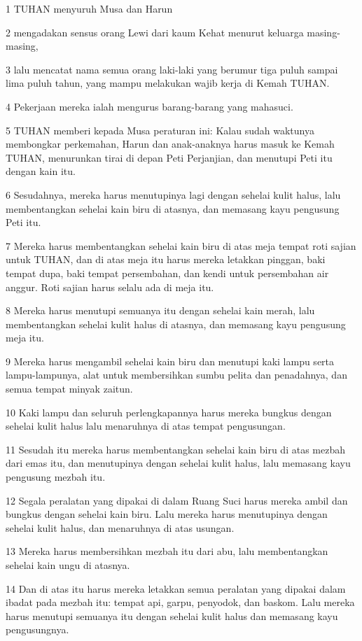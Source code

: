 \par 1 TUHAN menyuruh Musa dan Harun
\par 2 mengadakan sensus orang Lewi dari kaum Kehat menurut keluarga masing-masing,
\par 3 lalu mencatat nama semua orang laki-laki yang berumur tiga puluh sampai lima puluh tahun, yang mampu melakukan wajib kerja di Kemah TUHAN.
\par 4 Pekerjaan mereka ialah mengurus barang-barang yang mahasuci.
\par 5 TUHAN memberi kepada Musa peraturan ini: Kalau sudah waktunya membongkar perkemahan, Harun dan anak-anaknya harus masuk ke Kemah TUHAN, menurunkan tirai di depan Peti Perjanjian, dan menutupi Peti itu dengan kain itu.
\par 6 Sesudahnya, mereka harus menutupinya lagi dengan sehelai kulit halus, lalu membentangkan sehelai kain biru di atasnya, dan memasang kayu pengusung Peti itu.
\par 7 Mereka harus membentangkan sehelai kain biru di atas meja tempat roti sajian untuk TUHAN, dan di atas meja itu harus mereka letakkan pinggan, baki tempat dupa, baki tempat persembahan, dan kendi untuk persembahan air anggur. Roti sajian harus selalu ada di meja itu.
\par 8 Mereka harus menutupi semuanya itu dengan sehelai kain merah, lalu membentangkan sehelai kulit halus di atasnya, dan memasang kayu pengusung meja itu.
\par 9 Mereka harus mengambil sehelai kain biru dan menutupi kaki lampu serta lampu-lampunya, alat untuk membersihkan sumbu pelita dan penadahnya, dan semua tempat minyak zaitun.
\par 10 Kaki lampu dan seluruh perlengkapannya harus mereka bungkus dengan sehelai kulit halus lalu menaruhnya di atas tempat pengusungan.
\par 11 Sesudah itu mereka harus membentangkan sehelai kain biru di atas mezbah dari emas itu, dan menutupinya dengan sehelai kulit halus, lalu memasang kayu pengusung mezbah itu.
\par 12 Segala peralatan yang dipakai di dalam Ruang Suci harus mereka ambil dan bungkus dengan sehelai kain biru. Lalu mereka harus menutupinya dengan sehelai kulit halus, dan menaruhnya di atas usungan.
\par 13 Mereka harus membersihkan mezbah itu dari abu, lalu membentangkan sehelai kain ungu di atasnya.
\par 14 Dan di atas itu harus mereka letakkan semua peralatan yang dipakai dalam ibadat pada mezbah itu: tempat api, garpu, penyodok, dan baskom. Lalu mereka harus menutupi semuanya itu dengan sehelai kulit halus dan memasang kayu pengusungnya.
